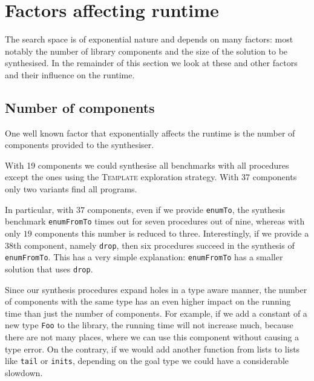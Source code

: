 \section{Factors affecting runtime}\label{Factors affecting runtime}
The search space is of exponential nature and depends on many factors: most notably the number of library components and the size of the solution to be synthesised. In the remainder of this section we look at these and other factors and their influence on the runtime.

\subsection{Number of components}
One well known factor that exponentially affects the runtime is the number of components provided to the synthesiser.

With 19 components we could synthesise all benchmarks with all procedures except the ones using the \textsc{Template} exploration strategy. With 37 components only two variants find all programs.

In particular, with $37$ components, even if we provide \lstinline?enumTo?, the synthesis benchmark \lstinline?enumFromTo? times out for seven procedures out of nine, whereas with only $19$ components this number is reduced to three.
Interestingly, if we provide a $38$th component, namely \lstinline?drop?, then six procedures succeed in the synthesis of \lstinline?enumFromTo?. This has a very simple explanation: \lstinline?enumFromTo? has a smaller solution that uses \lstinline?drop?.

Since our synthesis procedures expand holes in a type aware manner, the number of components with the same type has an even higher impact on the running time than just the number of components. For example, if we add a constant of a new type \lstinline?Foo? to the library, the running time will not increase much, because there are not many places, where we can use this component without causing a type error. On the contrary, if we would add another function from lists to lists like \lstinline?tail? or \lstinline?inits?, depending on the goal type we could have a considerable slowdown. 

